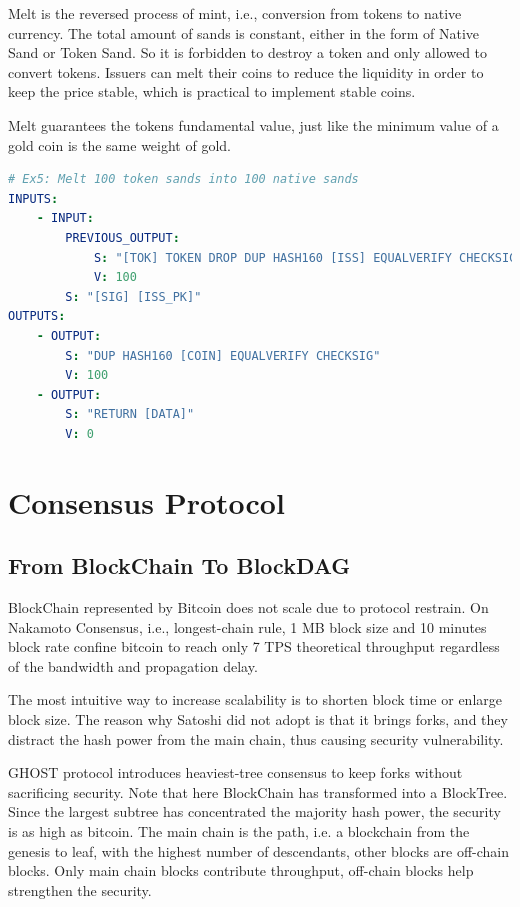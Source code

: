 \documentclass[a4paper,11pt]{article}
\begin{document}
Melt is the reversed process of mint, i.e., conversion from tokens to native currency. The total amount of sands is constant, either in the form of Native Sand or Token Sand. So it is forbidden to destroy a token and only allowed to convert tokens. Issuers can melt their coins to reduce the liquidity in order to keep the price stable, which is practical to implement stable coins.


Melt guarantees the tokens fundamental value, just like the minimum value of a gold coin is the same weight of gold. 

\lstset{basicstyle=\tiny,style=myListStyle}
\begin{lstlisting}[language=yaml, numbers=none]
# Ex5: Melt 100 token sands into 100 native sands
INPUTS:
	- INPUT:
		PREVIOUS_OUTPUT:
			S: "[TOK] TOKEN DROP DUP HASH160 [ISS] EQUALVERIFY CHECKSIG"
			V: 100
		S: "[SIG] [ISS_PK]"
OUTPUTS:
	- OUTPUT:
		S: "DUP HASH160 [COIN] EQUALVERIFY CHECKSIG"
		V: 100
	- OUTPUT:
		S: "RETURN [DATA]"
		V: 0
\end{lstlisting}


\section{Consensus Protocol}


\subsection{From BlockChain To BlockDAG}
BlockChain represented by Bitcoin does not scale due to protocol restrain. On Nakamoto Consensus, i.e., longest-chain rule, 1 MB block size and 10 minutes block rate confine bitcoin to reach only 7 TPS  theoretical throughput regardless of the bandwidth and propagation delay. 

The most intuitive way to increase scalability is to shorten block time or enlarge block size. The reason why Satoshi did not adopt is that it brings forks, and they distract the hash power from the main chain, thus causing security vulnerability.  

GHOST protocol introduces heaviest-tree consensus to keep forks without sacrificing security. Note that here BlockChain has transformed into a BlockTree. Since the largest subtree has concentrated the majority hash power, the security is as high as bitcoin. The main chain is the path,  i.e. a blockchain from the genesis to leaf, with the highest number of descendants, other blocks are off-chain blocks. Only main chain blocks contribute throughput, off-chain blocks help strengthen the security.
\end{document}
